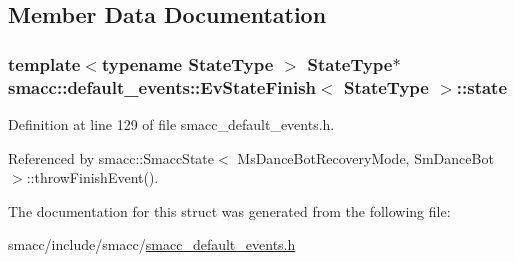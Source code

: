 \subsection{Member Data Documentation}
\subsubsection[{\texorpdfstring{state}{state}}]{\setlength{\rightskip}{0pt plus 5cm}template$<$typename State\+Type $>$ State\+Type$\ast$ {\bf smacc\+::default\+\_\+events\+::\+Ev\+State\+Finish}$<$ State\+Type $>$\+::state}\hypertarget{structsmacc_1_1default__events_1_1EvStateFinish_ad598cccf2b8ddb507f3c0efba2232d62}{}\label{structsmacc_1_1default__events_1_1EvStateFinish_ad598cccf2b8ddb507f3c0efba2232d62}


Definition at line 129 of file smacc\+\_\+default\+\_\+events.\+h.



Referenced by smacc\+::\+Smacc\+State$<$ Ms\+Dance\+Bot\+Recovery\+Mode, Sm\+Dance\+Bot $>$\+::throw\+Finish\+Event().



The documentation for this struct was generated from the following file\+:\begin{DoxyCompactItemize}
\item 
smacc/include/smacc/\hyperlink{smacc__default__events_8h}{smacc\+\_\+default\+\_\+events.\+h}\end{DoxyCompactItemize}
